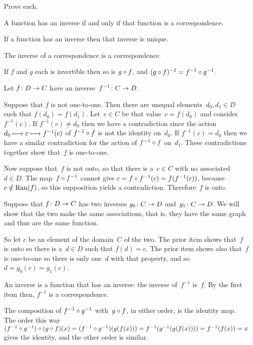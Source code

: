 \documentclass{ibl}  %
\begin{document}
\begin{ex} \label{PropertiesOfInverses}
Prove each.
\begin{exes}
\item A function has an inverse if and only if that 
  function is a correspondence.
\item If a function has an inverse then that inverse
  is unique.
\item The inverse of a correspondence is a correspondence.  
\item If $f$ and $g$ each is invertible then so is 
  $g\mathbin{\circ} f$, and $(g\mathbin{\circ} f)^{-1}=f^{-1}\mathbin{\circ} g^{-1}$.
\end{exes}
\begin{ans}
\begin{exes}
\item Let $\mbox{$f\colon D\to C$}$ have an inverse~$\mbox{$f^{-1}\colon C\to D$}$.

  Suppose that $f$ is not one-to-one.
  Then there are unequal elements~$d_0,d_1\in D$
  such that $f(d_0)=f(d_1)$.
  Let~$c\in C$ be that value~$c=f(d_0)$ and consider~$f^{-1}(c)$.
  If $f^{-1}(c)\neq d_0$ then we have a contradiction since the 
  action $d_0\stackrel{}{\longmapsto}c\stackrel{}{\longmapsto}f^{-1}(c)$
  of $f^{-1}\mathbin{\circ} f$ is not the identity on~$d_0$.
  If $f^{-1}(c)=d_0$ then we have a similar contradiction for the
  action of $f^{-1}\mathbin{\circ} f$ on~$d_1$.
  These contradictions together show that~$f$ is one-to-one.
   
  Now suppose that~$f$ is not onto,
  so that there is a~$c\in C$ with no associated~$d\in D$.
  The map~$f\mathbin{\circ} f^{-1}$
  cannot give $c=f\mathbin{\circ} f^{-1}(c)=f(f^{-1}(c))$, 
  because $c\notin\operatorname{Ran}(f)$, so this supposition yields a contradiction.
  Therefore~$f$ is onto.
\item Suppose that $\mbox{$f\colon D\to C$}$ has two inverses $\mbox{$g_0\colon C\to D$}$
  and~$\mbox{$g_1\colon C\to D$}$.
  We will show that the two make the same associations, that is, they 
  have the same graph and
  thus are the same function.

  So let $c$ be an element of the domain~$C$ of the two.
  The prior item shows that~$f$ is onto so there is a~$d\in D$ such that
  $f(d)=c$.
  The prior item shows also that~$f$ is one-to-one so there is only 
  one~$d$ with that property, and so $d=g_0(c)=g_1(c)$.
\item An inverse is a function that has an inverse: the inverse of~$f^{-1}$
  is~$f$.
  By the first item then, $f^{-1}$ is a correspondence.
\item The composition of $f^{-1}\mathbin{\circ} g^{-1}$ with~$g\mathbin{\circ} f$,
  in either order, is the identity map.
  The order this way  
  $(f^{-1}\mathbin{\circ} g^{-1})\mathbin{\circ} (g\mathbin{\circ} f)(x)
  =(f^{-1}\mathbin{\circ} g^{-1})(g(f(x)))
  =f^{-1}(g^{-1}(g(f(x))))
  =f^{-1}(f(x))=x$
  gives the identity,
  and the other order is similar.
\end{exes}
\end{ans}
\end{ex}
\end{document}
